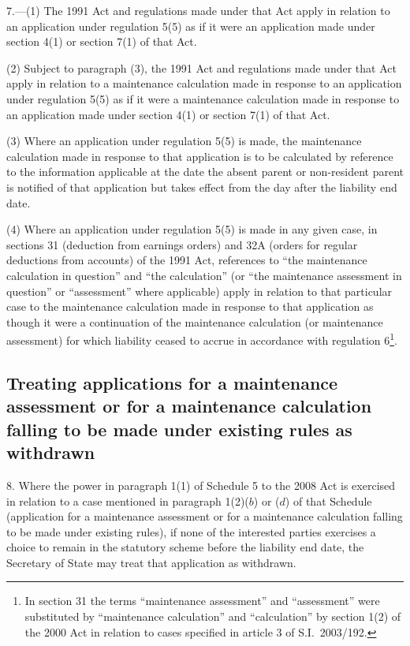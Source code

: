 \documentclass[12pt,a4paper]{article}
\begin{document}
7.—(1) The 1991 Act and regulations made under that Act apply in relation to an application under regulation 5(5) as if it were an application made under section 4(1) or section 7(1) of that Act.

(2) Subject to paragraph (3), the 1991 Act and regulations made under that Act apply in relation to a maintenance calculation made in response to an application under regulation 5(5) as if it were a maintenance calculation made in response to an application made under section 4(1) or section 7(1) of that Act.

(3) Where an application under regulation 5(5) is made, the maintenance calculation made in response to that application is to be calculated by reference to the information applicable at the date the absent parent or non-resident parent is notified of that application but takes effect from the day after the liability end date.

(4) Where an application under regulation 5(5) is made in any given case, in sections 31 (deduction from earnings orders) and 32A (orders for regular deductions from accounts) of the 1991 Act, references to “the maintenance calculation in question” and “the calculation” (or “the maintenance assessment in question” or “assessment” where applicable) apply in relation to that particular case to the maintenance calculation made in response to that application as though it were a continuation of the maintenance calculation (or maintenance assessment) for which liability ceased to accrue in accordance with regulation 6\footnote{In section 31 the terms “maintenance assessment” and “assessment” were substituted by “maintenance calculation” and “calculation” by section 1(2) of the 2000 Act in relation to cases specified in article 3 of S.I.~2003/192.}.

\subsection[8. Treating applications for a maintenance assessment or for a maintenance calculation falling to be made under existing rules as withdrawn]{Treating applications for a maintenance assessment or for a maintenance calculation falling to be made under existing rules as withdrawn}

8.  Where the power in paragraph 1(1) of Schedule 5 to the 2008 Act is exercised in relation to a case mentioned in paragraph 1(2)($b$)  or ($d$)  of that Schedule (application for a maintenance assessment or for a maintenance calculation falling to be made under existing rules), if none of the interested parties exercises a choice to remain in the statutory scheme before the liability end date, the Secretary of State may treat that application as withdrawn. 
\end{document}
